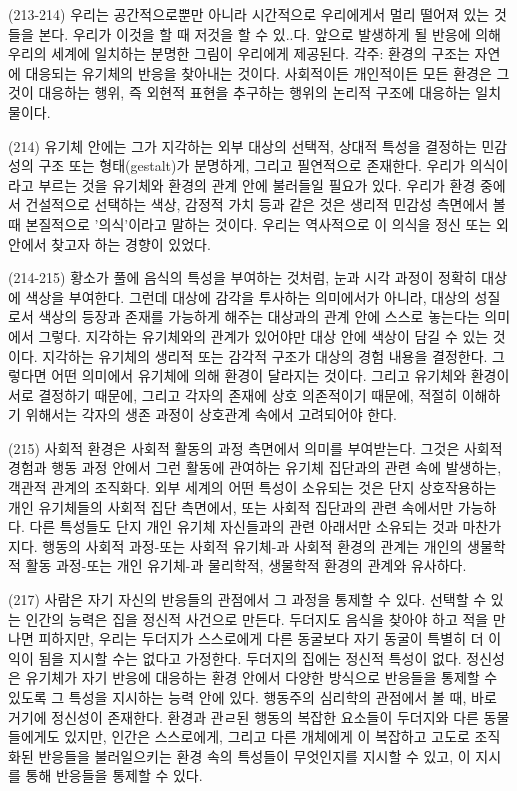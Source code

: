\documentclass[11pt, a4paper]{article}
\begin{document}
(213-214) 우리는 공간적으로뿐만 아니라 시간적으로 우리에게서 멀리 떨어져 있는 것들을 본다. 우리가 이것을 할 때 저것을 할 수 있..다. 앞으로 발생하게 될 반응에 의해 우리의 세계에 일치하는 분명한 그림이 우리에게 제공된다. 각주: 환경의 구조는 자연에 대응되는 유기체의 반응을 찾아내는 것이다. 사회적이든 개인적이든 모든 환경은 그것이 대응하는 행위, 즉 외현적 표현을 추구하는 행위의 논리적 구조에 대응하는 일치물이다.

(214) 유기체 안에는 그가 지각하는 외부 대상의 선택적, 상대적 특성을 결정하는 민감성의 구조 또는 형태(gestalt)가 분명하게, 그리고 필연적으로 존재한다. 우리가 의식이라고 부르는 것을 유기체와 환경의 관계 안에 불러들일 필요가 있다. 우리가 환경 중에서 건설적으로 선택하는 색상, 감정적 가치 등과 같은 것은 생리적 민감성 측면에서 볼 때 본질적으로 '의식'이라고 말하는 것이다. 우리는 역사적으로 이 의식을 정신 또는 외 안에서 찾고자 하는 경향이 있었다.

(214-215) 황소가 풀에 음식의 특성을 부여하는 것처럼, 눈과 시각 과정이 정확히 대상에 색상을 부여한다. 그런데 대상에 감각을 투사하는 의미에서가 아니라, 대상의 성질로서 색상의 등장과 존재를 가능하게 해주는 대상과의 관계 안에 스스로 놓는다는 의미에서 그렇다. 지각하는 유기체와의 관계가 있어야만 대상 안에 색상이 담길 수 있는 것이다. 지각하는 유기체의 생리적 또는 감각적 구조가 대상의 경험 내용을 결정한다. 그렇다면 어떤 의미에서 유기체에 의해 환경이 달라지는 것이다. 그리고 유기체와 환경이 서로 결정하기 때문에, 그리고 각자의 존재에 상호 의존적이기 때문에, 적절히 이해하기 위해서는 각자의 생존 과정이 상호관계 속에서 고려되어야 한다. 

(215) 사회적 환경은 사회적 활동의 과정 측면에서 의미를 부여받는다. 그것은 사회적 경험과 행동 과정 안에서 그런 활동에 관여하는 유기체 집단과의 관련 속에 발생하는, 객관적 관계의 조직화다. 외부 세계의 어떤 특성이 소유되는 것은 단지 상호작용하는 개인 유기체들의 사회적 집단 측면에서, 또는 사회적 집단과의 관련 속에서만 가능하다. 다른 특성들도 단지 개인 유기체 자신들과의 관련 아래서만 소유되는 것과 마찬가지다. 행동의 사회적 과정-또는 사회적 유기체-과 사회적 환경의 관계는 개인의 생물학적 활동 과정-또는 개인 유기체-과 물리학적, 생물학적 환경의 관계와 유사하다.

(217) 사람은 자기 자신의 반응들의 관점에서 그 과정을 통제할 수 있다. 선택할 수 있는 인간의 능력은 집을 정신적 사건으로 만든다. 두더지도 음식을 찾아야 하고 적을 만나면 피하지만, 우리는 두더지가 스스로에게 다른 동굴보다 자기 동굴이 특별히 더 이익이 됨을 지시할 수는 없다고 가정한다. 두더지의 집에는 정신적 특성이 없다. 정신성은 유기체가 자기 반응에 대응하는 환경 안에서 다양한 방식으로 반응들을 통제할 수 있도록 그 특성을 지시하는 능력 안에 있다. 행동주의 심리학의 관점에서 볼 때, 바로 거기에 정신성이 존재한다. 환경과 관ㄹ된 행동의 복잡한 요소들이 두더지와 다른 동물들에게도 있지만, 인간은 스스로에게, 그리고 다른 개체에게 이 복잡하고 고도로 조직화된 반응들을 불러일으키는 환경 속의 특성들이 무엇인지를 지시할 수 있고, 이 지시를 통해 반응들을 통제할 수 있다. 
\end{document}
